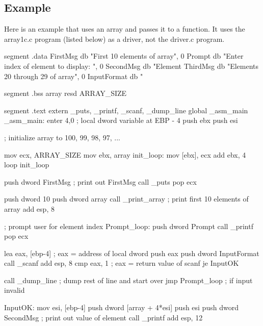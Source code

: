 \subsection{Example}
Here is an example that uses an array and passes it to a function. It uses the
{\code array1c.c} program (listed below) as a driver, not the 
{\code driver.c} program. 
\begin{AsmCodeListing}[label=array1.asm]

segment .data
FirstMsg        db   "First 10 elements of array", 0
Prompt          db   "Enter index of element to display: ", 0
SecondMsg       db   "Element %
ThirdMsg        db   "Elements 20 through 29 of array", 0
InputFormat     db   "%

segment .bss
array           resd ARRAY_SIZE

segment .text
        extern  _puts, _printf, _scanf, _dump_line
        global  _asm_main
_asm_main:
        enter   4,0		; local dword variable at EBP - 4
        push    ebx
        push    esi

; initialize array to 100, 99, 98, 97, ...

        mov     ecx, ARRAY_SIZE
        mov     ebx, array
init_loop:
        mov     [ebx], ecx
        add     ebx, 4
        loop    init_loop

        push    dword FirstMsg         ; print out FirstMsg
        call    _puts
        pop     ecx

        push    dword 10
        push    dword array
        call    _print_array           ; print first 10 elements of array
        add     esp, 8

; prompt user for element index
Prompt_loop:
        push    dword Prompt
        call    _printf
        pop     ecx

        lea     eax, [ebp-4]      ; eax = address of local dword
        push    eax
        push    dword InputFormat
        call    _scanf
        add     esp, 8
        cmp     eax, 1               ; eax = return value of scanf
        je      InputOK

        call    _dump_line  ; dump rest of line and start over
        jmp     Prompt_loop          ; if input invalid

InputOK:
        mov     esi, [ebp-4]
        push    dword [array + 4*esi]
        push    esi
        push    dword SecondMsg      ; print out value of element
        call    _printf
        add     esp, 12


\end{AsmCodeListing}
